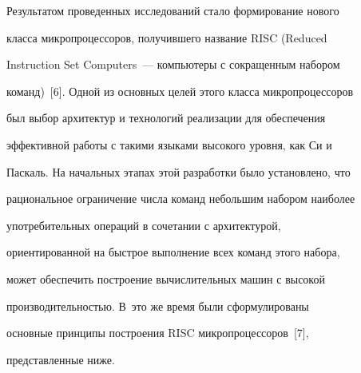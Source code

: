 Результатом проведенных исследований стало формирование нового 


класса микропроцессоров, получившего название RISC (Reduced 


Instruction Set Computers~--- компьютеры с сокращенным набором 


команд)~[6]. Одной из основных целей этого класса микропроцессоров 


был выбор архитектур и технологий реализации для обеспечения 


эффективной работы с такими языками высокого уровня, как Си и 


Паскаль. На начальных этапах этой разработки было установлено, что 


рациональное ограничение числа команд небольшим набором наиболее  


употребительных операций в сочетании с архитектурой, 


ориентированной на быстрое выполнение всех команд этого набора, 


может обеспечить построение вычислительных машин с высокой 


производительностью. В~это же время были сформулированы  


основные принципы построения RISC микропроцессоров~[7], 


представленные ниже.  


